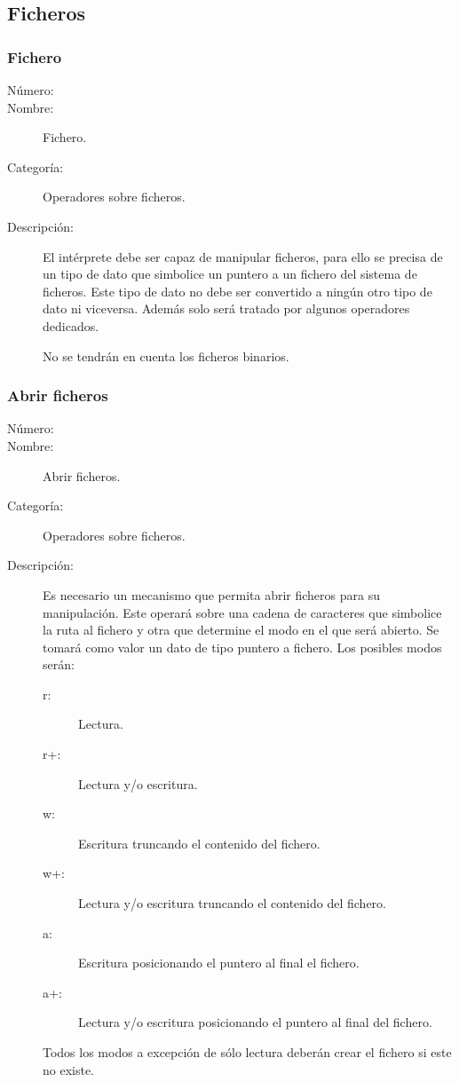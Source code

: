 \subsection{Ficheros}
\subsubsection{Fichero}
\begin{framed}
	\begin{description}
		\item [Número:] \cn
		\item [Nombre:] Fichero.
		\item [Categoría:] Operadores sobre ficheros.
		\item [Descripción:] El intérprete debe ser capaz de manipular ficheros, para ello se precisa de un tipo de dato
		que simbolice un puntero a un fichero del sistema de ficheros. Este tipo de dato no debe ser convertido a ningún otro
		tipo de dato ni viceversa. Además solo será tratado por algunos operadores dedicados. 
		
		No se tendrán en cuenta los  ficheros binarios.
	\end{description}
\end{framed}

\subsubsection{Abrir ficheros}
\begin{framed}
	\begin{description}
		\item [Número:] \cn
		\item [Nombre:] Abrir ficheros.
		\item [Categoría:] Operadores sobre ficheros.
		\item [Descripción:] Es necesario un mecanismo que permita abrir ficheros para su manipulación. Este operará sobre
		una cadena de caracteres que simbolice la ruta al fichero y otra que determine el modo en el que será abierto. Se 
		tomará como valor un dato de tipo puntero a fichero. Los posibles modos serán:
		
		\begin{description}
			\item [r:] Lectura.
			\item [r+:] Lectura y/o escritura.
			\item [w:] Escritura truncando el contenido del fichero.
			\item [w+:] Lectura y/o escritura truncando el contenido del fichero.
			\item [a:] Escritura posicionando el puntero al final el fichero.
			\item [a+:] Lectura y/o escritura posicionando el puntero al final del fichero.
		\end{description}
		
		Todos los modos a excepción de sólo lectura deberán crear el fichero si este no existe.  
	\end {description}
\end{framed}

